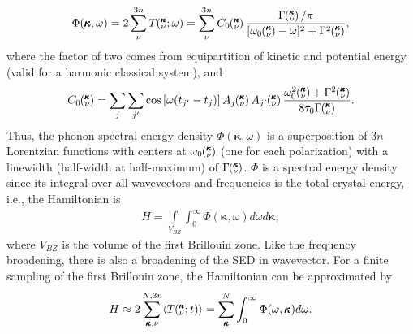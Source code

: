 \documentclass[letterpaper,12pt]{article}
\newcommand{\kvt}{\mspace{-4.0mu}\left(\mspace{-8.0mu}\begin{smallmatrix}&\pmb{\kappa} \\&\nu\end{smallmatrix}\mspace{-2.0mu};t\right)}
\newcommand{\kvw}{\mspace{-4.0mu}\left(\mspace{-8.0mu}\begin{smallmatrix}&\pmb{\kappa} \\&\nu\end{smallmatrix}\mspace{-2.0mu};\omega\right)}
\newcommand{\kv}{\mspace{-4.0mu}\left(\mspace{-8.0mu}\begin{smallmatrix}&\pmb{\kappa} \\&\nu\end{smallmatrix}\mspace{-3.0mu}\right)}
\begin{document}
\begin{equation}\label{A:E:Lorentzian_NMD}
\begin{split}
\Phi(\pmb{\kappa},\omega) = 2\sum_{\nu}^{3n} T\kvw=\sum_{\nu}^{3n}C_0\kv\frac{\Gamma\kv/\pi}{[\omega_0\kv-\omega]^2+\Gamma^2\kv},
\end{split}
\end{equation}
where the factor of two comes from equipartition of kinetic and potential energy (valid for a harmonic classical system), and
\begin{equation}\label{A:E:C_0}
\begin{split}
C_0\kv = \sum_j\sum_{j'}\cos\left[\omega (t_{j'}-t_j)\right]A_j\kv A_{j'}\kv\frac{\omega_0^2\kv+\Gamma^2\kv}{8\tau_0\Gamma\kv}.
\end{split}
\end{equation}
Thus, the phonon spectral energy density $\Phi(\pmb{\kappa},\omega)$ is a superposition of $3n$ Lorentzian
functions with centers at $\omega_0\kv$ (one for each polarization) with a linewidth (half-width at half-maximum) of
$\Gamma\kv$. $\Phi$ is a spectral energy density since its integral over all wavevectors and frequencies is the total crystal energy, i.e., the Hamiltonian is
\begin{equation}\label{A:E:equipartition}
\begin{split}
H=\int\limits_{V_{BZ}} \int_{0}^{\infty}\Phi(\pmb{\kappa},\omega)d\omega d\pmb{\kappa},
\end{split}
\end{equation}
where $V_{BZ}$ is the volume of the first Brillouin zone.  Like the frequency broadening, there is also a broadening of the SED in wavevector.\cite{turneythesis} For a finite sampling of the first Brillouin zone, the Hamiltonian can be approximated by
\begin{equation}\label{A:E:equipartition}
\begin{split}
H \approx 2\sum_{\pmb{\kappa},\nu}^{N,3n}\langle T\kvt\rangle = \sum_{\pmb{\kappa}}^N \int_{0}^{\infty}\Phi(\omega,\pmb{\kappa})d\omega.
\end{split}
\end{equation}

%
%
%
%
%
%
\end{document}
